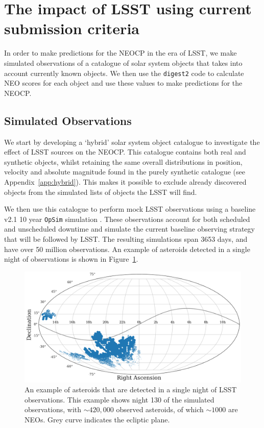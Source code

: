 \documentclass[twocolumn]{aastex631}
\newcommand{\dig}{\texttt{digest2}}
\begin{document}
\section{The impact of LSST using current submission criteria}\label{sec:current_impact}
In order to make predictions for the NEOCP in the era of LSST, we make simulated observations of a catalogue of solar system objects that takes into account currently known objects. We then use the \dig{} code to calculate NEO scores for each object and use these values to make predictions for the NEOCP.

\subsection{Simulated Observations}
We start by developing a `hybrid' solar system object catalogue to investigate the effect of LSST sources on the NEOCP. This catalogue contains both real and synthetic objects, whilst retaining the same overall distributions in position, velocity and absolute magnitude found in the purely synthetic catalogue (see Appendix~\ref{app:hybrid}). This makes it possible to exclude already discovered objects from the simulated lists of objects the LSST will find.

We then use this catalogue to perform mock LSST observations using a baseline v2.1 10 year \texttt{OpSim} simulation \citep{opsim, Cornwall+2020}. These observations account for both scheduled and unscheduled downtime and simulate the current baseline observing strategy that will be followed by LSST. The resulting simulations span 3653 days, and have over 50 million observations. An example of asteroids detected in a single night of observations is shown in Figure~\ref{fig:observations_per_night}.

\begin{figure}
    \centering
    \includegraphics[width=\columnwidth]{observations_placeholder.pdf}
    \caption{An example of asteroids that are detected in a single night of LSST observations. This example shows night 130 of the simulated observations, with ${\sim}420,000$ observed asteroids, of which ${\sim}1000$ are NEOs. Grey curve indicates the ecliptic plane.}
    \label{fig:observations_per_night}
\end{figure}
\end{document}
